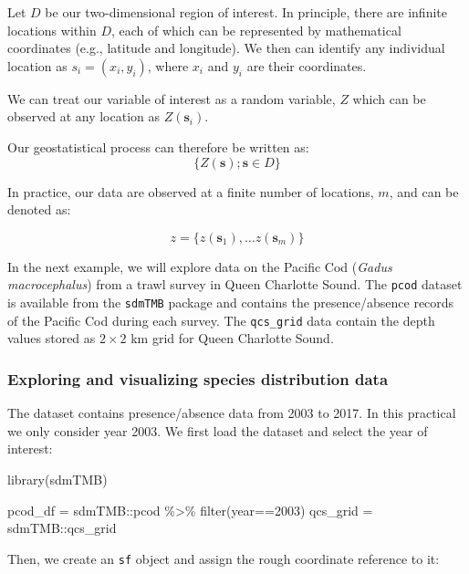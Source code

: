 \documentclass[
  letterpaper,
  DIV=11,
  numbers=noendperiod]{scrartcl}
\newenvironment{Shaded}{\begin{snugshade}}{\end{snugshade}}
\newcommand{\DecValTok}[1]{\textcolor[rgb]{0.68,0.00,0.00}{#1}}
\newcommand{\FunctionTok}[1]{\textcolor[rgb]{0.28,0.35,0.67}{#1}}
\newcommand{\NormalTok}[1]{\textcolor[rgb]{0.00,0.23,0.31}{#1}}
\newcommand{\OtherTok}[1]{\textcolor[rgb]{0.00,0.23,0.31}{#1}}
\newcommand{\SpecialCharTok}[1]{\textcolor[rgb]{0.37,0.37,0.37}{#1}}
\begin{document}
Let \(D\) be our two-dimensional region of interest. In principle, there
are infinite locations within \(D\), each of which can be represented by
mathematical coordinates (e.g., latitude and longitude). We then can
identify any individual location as \(s_i = (x_i, y_i)\), where \(x_i\)
and \(y_i\) are their coordinates.

We can treat our variable of interest as a random variable, \(Z\) which
can be observed at any location as \(Z(\mathbf{s}_i)\).

Our geostatistical process can therefore be written as:
\[\{Z(\mathbf{s}); \mathbf{s} \in D\}\]

In practice, our data are observed at a finite number of locations,
\(m\), and can be denoted as:

\[z = \{z(\mathbf{s}_1), \ldots z(\mathbf{s}_m) \}\]

In the next example, we will explore data on the Pacific Cod
(\emph{Gadus macrocephalus}) from a trawl survey in Queen Charlotte
Sound. The \texttt{pcod} dataset is available from the \texttt{sdmTMB}
package and contains the presence/absence records of the Pacific Cod
during each survey. The \texttt{qcs\_grid} data contain the depth values
stored as \(2\times 2\) km grid for Queen Charlotte Sound.

\subsubsection{Exploring and visualizing species distribution
data}\label{exploring-and-visualizing-species-distribution-data}

The dataset contains presence/absence data from 2003 to 2017. In this
practical we only consider year 2003. We first load the dataset and
select the year of interest:

\begin{Shaded}
\begin{Highlighting}[]
\FunctionTok{library}\NormalTok{(sdmTMB)}

\NormalTok{pcod\_df }\OtherTok{=}\NormalTok{ sdmTMB}\SpecialCharTok{::}\NormalTok{pcod }\SpecialCharTok{\%\textgreater{}\%} \FunctionTok{filter}\NormalTok{(year}\SpecialCharTok{==}\DecValTok{2003}\NormalTok{)}
\NormalTok{qcs\_grid }\OtherTok{=}\NormalTok{ sdmTMB}\SpecialCharTok{::}\NormalTok{qcs\_grid}
\end{Highlighting}
\end{Shaded}

Then, we create an \texttt{sf} object and assign the rough coordinate
reference to it:
\end{document}
